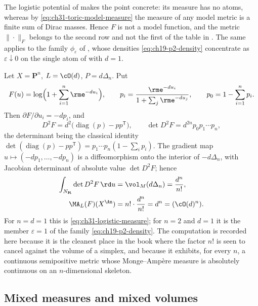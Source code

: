 The logistic potential of  makes the point
concrete: its measure has no atoms, whereas by
\eqref{eq:ch31-toric-model-measure} the measure of any model metric is a
finite sum of Dirac masses.  Hence \(F\) is not a model function, and the
metric \(\|\cdot\|_F\) belongs to the second row and not the first of the
table in .  The same applies to the family
\(\phi_\varepsilon\) of , whose densities
\eqref{eq:ch19-p2-density} concentrate as \(\varepsilon\downarrow0\) on the
single atom of  with \(d=1\).

\begin{example}
\label{ex:ch31-toric-logsumexp}
Let \(X=\mathbf P^n\), \(L=\cO(d)\), \(P=d\Delta_n\).  Put
\[
 F(u)=\log\Bigl(1+\sum_{i=1}^n\rme^{-du_i}\Bigr),
 \qquad
 p_i=\frac{\rme^{-du_i}}{1+\sum_j\rme^{-du_j}},
 \qquad
 p_0=1-\sum_{i=1}^np_i .
\]
Then \(\partial F/\partial u_i=-dp_i\), and
\[
 D^2F=d^2\bigl(\operatorname{diag}(p)-pp^{\mathsf T}\bigr),
 \qquad
 \det D^2F=d^{2n}p_0p_1\cdots p_n ,
\]
the determinant being the classical identity
\(\det(\operatorname{diag}(p)-pp^{\mathsf T})=p_1\cdots p_n(1-\sum_ip_i)\).
The gradient map \(u\mapsto(-dp_1,\ldots,-dp_n)\) is a diffeomorphism onto
the interior of \(-d\Delta_n\), with Jacobian determinant of absolute value
\(\det D^2F\); hence
\begin{equation}
\label{eq:ch31-logsumexp-mass}
 \begin{aligned}
 \int_{N_\mathbf R}\det D^2F\,\rd u
   &=\vol_M(d\Delta_n)=\frac{d^n}{n!},\\
 \MA_L(F)(X^{\An})
   &=n!\cdot\frac{d^n}{n!}=d^n=(\cO(d)^n).
 \end{aligned}
\end{equation}
For \(n=d=1\) this is \eqref{eq:ch31-logistic-measure}; for \(n=2\) and
\(d=1\) it is the member \(\varepsilon=1\) of the family
\eqref{eq:ch19-p2-density}.  The computation is recorded here because it is
the cleanest place in the book where the factor \(n!\) is seen to cancel
against the volume of a simplex, and because it exhibits, for every \(n\),
a continuous semipositive metric whose Monge--Amp\`ere measure is
absolutely continuous on an \(n\)-dimensional skeleton.
\end{example}

\subsection{Mixed measures and mixed volumes}
\label{sec:ch31-toric-mixed}

